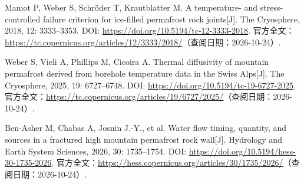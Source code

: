 Mamot P, Weber S, Schröder T, Krautblatter M.
A temperature- and stress-controlled failure criterion for ice-filled permafrost rock joints[J].
The Cryosphere, 2018, 12: 3333--3353.
DOI: \url{https://doi.org/10.5194/tc-12-3333-2018}.
官方全文：\url{https://tc.copernicus.org/articles/12/3333/2018/}（查阅日期：2026-10-24）.

Weber S, Vieli A, Phillips M, Cicoira A.
Thermal diffusivity of mountain permafrost derived from borehole temperature data in the Swiss Alps[J].
The Cryosphere, 2025, 19: 6727--6748.
DOI: \url{https://doi.org/10.5194/tc-19-6727-2025}.
官方全文：\url{https://tc.copernicus.org/articles/19/6727/2025/}（查阅日期：2026-10-24）.

Ben-Asher M, Chabas A, Josnin J.-Y., et al.
Water flow timing, quantity, and sources in a fractured high mountain permafrost rock wall[J].
Hydrology and Earth System Sciences, 2026, 30: 1735--1754.
DOI: \url{https://doi.org/10.5194/hess-30-1735-2026}.
官方全文：\url{https://hess.copernicus.org/articles/30/1735/2026/}（查阅日期：2026-10-24）.
